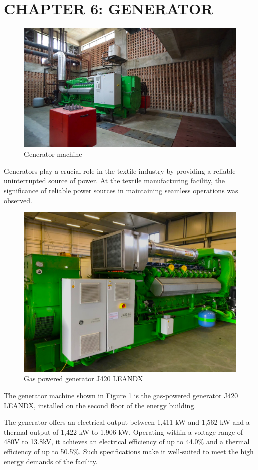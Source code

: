 \section{CHAPTER 6: GENERATOR \cite{j420}}
\begin{figure}[h!]
    \centering
    \includegraphics[width=1\linewidth]{figs/generator.jpg}
    \caption{Generator machine}
    \label{fig:generator}
\end{figure}

Generators play a crucial role in the textile industry by providing a reliable uninterrupted source of power.  
At the textile manufacturing facility, the significance of reliable power sources in maintaining seamless operations was observed.
\begin{figure}
    \centering
    \includegraphics[width=1\linewidth]{figs/gas_gen_j420_leandx.png}
    \caption{Gas powered generator J420 LEANDX}
    \label{fig:gas_gen}
\end{figure}

The generator machine shown in Figure \ref{fig:generator} is the gas-powered generator J420 LEANDX, installed on the second floor of the energy building.

The generator offers an electrical output between 1,411 kW and 1,562 kW and a thermal output of 1,422 kW to 1,906 kW. Operating within a voltage range of 480V to 13.8kV, it achieves an electrical efficiency of up to 44.0\% and a thermal efficiency of up to 50.5\%. Such specifications make it well-suited to meet the high energy demands of the facility.
